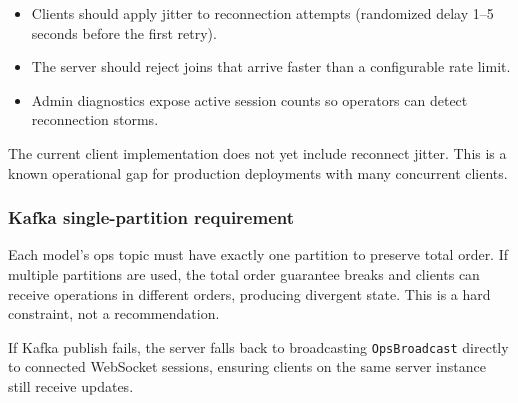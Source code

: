 \begin{itemize}
\item Clients should apply jitter to reconnection attempts (randomized delay
  1--5 seconds before the first retry).
\item The server should reject joins that arrive faster than a configurable
  rate limit.
\item Admin diagnostics expose active session counts so operators can detect
  reconnection storms.
\end{itemize}

The current client implementation does not yet include reconnect jitter. This
is a known operational gap for production deployments with many concurrent
clients.

\subsubsection{Kafka single-partition requirement}

Each model's ops topic must have exactly one partition to preserve total
order. If multiple partitions are used, the total order guarantee breaks and
clients can receive operations in different orders, producing divergent state.
This is a hard constraint, not a recommendation.

If Kafka publish fails, the server falls back to broadcasting
\texttt{OpsBroadcast} directly to connected WebSocket sessions, ensuring
clients on the same server instance still receive updates.
